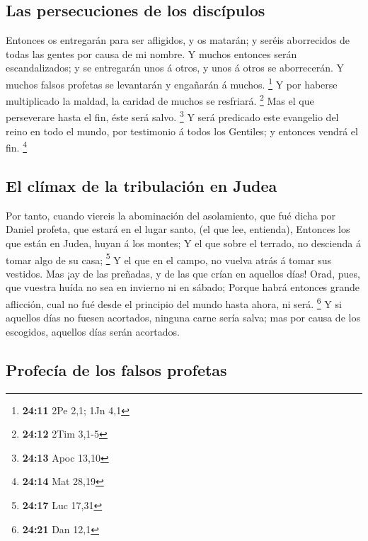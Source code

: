 \hypertarget{las-persecuciones-de-los-discuxedpulos}{%
\subsection{Las persecuciones de los
discípulos}\label{las-persecuciones-de-los-discuxedpulos}}

 Entonces os entregarán para ser afligidos, y os matarán; y
seréis aborrecidos de todas las gentes por causa de mi nombre.
 Y muchos entonces serán escandalizados; y se entregarán
unos á otros, y unos á otros se aborrecerán.  Y muchos
falsos profetas se levantarán y engañarán á muchos. \footnote{\textbf{24:11}
  2Pe 2,1; 1Jn 4,1}  Y por haberse multiplicado la maldad,
la caridad de muchos se resfriará. \footnote{\textbf{24:12} 2Tim 3,1-5}
 Mas el que perseverare hasta el fin, éste será salvo.
\footnote{\textbf{24:13} Apoc 13,10}  Y será predicado este
evangelio del reino en todo el mundo, por testimonio á todos los
Gentiles; y entonces vendrá el fin. \footnote{\textbf{24:14} Mat 28,19}

\hypertarget{el-cluxedmax-de-la-tribulaciuxf3n-en-judea}{%
\subsection{El clímax de la tribulación en
Judea}\label{el-cluxedmax-de-la-tribulaciuxf3n-en-judea}}

 Por tanto, cuando viereis la abominación del asolamiento,
que fué dicha por Daniel profeta, que estará en el lugar santo, (el que
lee, entienda),  Entonces los que están en Judea, huyan á
los montes;  Y el que sobre el terrado, no descienda á
tomar algo de su casa; \footnote{\textbf{24:17} Luc 17,31} 
Y el que en el campo, no vuelva atrás á tomar sus vestidos.
 Mas ¡ay de las preñadas, y de las que crían en aquellos
días!  Orad, pues, que vuestra huída no sea en invierno ni
en sábado;  Porque habrá entonces grande aflicción, cual no
fué desde el principio del mundo hasta ahora, ni será. \footnote{\textbf{24:21}
  Dan 12,1}  Y si aquellos días no fuesen acortados,
ninguna carne sería salva; mas por causa de los escogidos, aquellos días
serán acortados.

\hypertarget{profecuxeda-de-los-falsos-profetas}{%
\subsection{Profecía de los falsos
profetas}\label{profecuxeda-de-los-falsos-profetas}}

